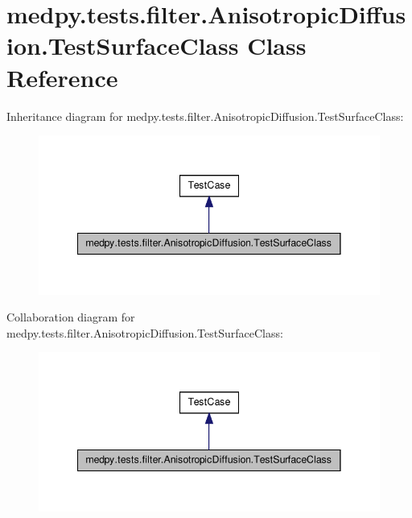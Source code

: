 \hypertarget{classmedpy_1_1tests_1_1filter_1_1AnisotropicDiffusion_1_1TestSurfaceClass}{
\section{medpy.tests.filter.AnisotropicDiffusion.TestSurfaceClass Class Reference}
\label{classmedpy_1_1tests_1_1filter_1_1AnisotropicDiffusion_1_1TestSurfaceClass}
}


Inheritance diagram for medpy.tests.filter.AnisotropicDiffusion.TestSurfaceClass:\nopagebreak
\begin{figure}[H]
\begin{center}
\leavevmode
\includegraphics[width=344pt]{classmedpy_1_1tests_1_1filter_1_1AnisotropicDiffusion_1_1TestSurfaceClass__inherit__graph}
\end{center}
\end{figure}


Collaboration diagram for medpy.tests.filter.AnisotropicDiffusion.TestSurfaceClass:\nopagebreak
\begin{figure}[H]
\begin{center}
\leavevmode
\includegraphics[width=344pt]{classmedpy_1_1tests_1_1filter_1_1AnisotropicDiffusion_1_1TestSurfaceClass__coll__graph}
\end{center}
\end{figure}
